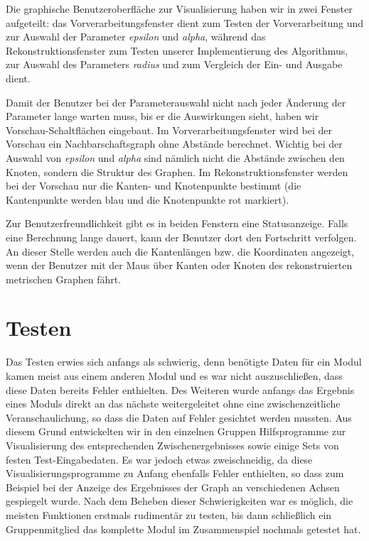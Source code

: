 \documentclass[parskip=half,
 fontsize=12pt, bibtotoc,
 ngerman]
 {article}
\begin{document}
Die graphische Benutzeroberfläche zur Visualisierung haben wir in zwei Fenster aufgeteilt: das Vorverarbeitungsfenster dient zum Testen der Vorverarbeitung und zur Auswahl der Parameter \emph{epsilon} und \emph{alpha}, während das Rekonstruktionsfenster zum Testen unserer Implementierung des Algorithmus, zur Auswahl des Parameters \emph{radius} und zum Vergleich der Ein- und Ausgabe dient.

Damit der Benutzer bei der Parameterauswahl nicht nach jeder Änderung der Parameter lange warten muss, bis er die Auswirkungen sieht, haben wir Vorschau-Schaltflächen eingebaut. Im Vorverarbeitungsfenster wird bei der Vorschau ein Nachbarschaftsgraph ohne Abstände berechnet. Wichtig bei der Auswahl von \emph{epsilon} und \emph{alpha} sind nämlich nicht die Abstände zwischen den Knoten, sondern die Struktur des Graphen. Im Rekonstruktionsfenster werden bei der Vorschau nur die Kanten- und Knotenpunkte bestimmt (die Kantenpunkte werden blau und die Knotenpunkte rot markiert).

Zur Benutzerfreundlichkeit gibt es in beiden Fenstern eine Statusanzeige. Falls eine Berechnung lange dauert, kann der Benutzer dort den Fortschritt verfolgen. An dieser Stelle werden auch die Kantenlängen bzw. die Koordinaten angezeigt, wenn der Benutzer mit der Maus über Kanten oder Knoten des rekonstruierten metrischen Graphen fährt.

\section{Testen}

Das Testen erwies sich anfangs als schwierig, denn benötigte Daten für ein Modul kamen meist aus einem anderen Modul und es war nicht auszuschließen, dass diese Daten bereits Fehler enthielten. Des Weiteren wurde anfangs das Ergebnis eines Moduls direkt an das nächste weitergeleitet ohne eine zwischenzeitliche Veranschaulichung, so dass die Daten auf Fehler gesichtet werden mussten. Aus diesem Grund entwickelten wir in den einzelnen Gruppen Hilfsprogramme zur Visualisierung des entsprechenden Zwischenergebnisses sowie einige Sets von festen Test-Eingabedaten. Es war jedoch etwas zweischneidig, da diese Visualisierungsprogramme zu Anfang ebenfalls Fehler enthielten, so dass zum Beispiel bei der Anzeige des Ergebnisses der Graph an verschiedenen Achsen gespiegelt wurde. Nach dem Beheben dieser Schwierigkeiten war es möglich, die meisten Funktionen erstmals rudimentär zu testen, bis dann schließlich ein Gruppenmitglied das komplette Modul im Zusammenspiel nochmals getestet hat.
\end{document}
